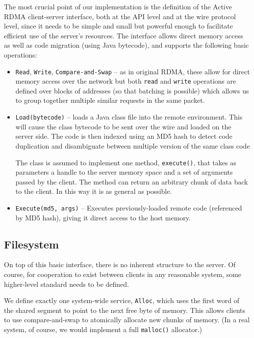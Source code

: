 \documentclass[10pt]{article}
\begin{document}
The most crucial point of our implementation is the definition of the
Active RDMA client-server interface, both at the API level and at the
wire protocol level, since it needs to be simple and small but
powerful enough to facilitate efficient use of the server's
resources. The interface allows direct memory access as well as code
migration (using Java bytecode), and supports the following basic
operations:

\begin{itemize}
  \item {\tt Read}, {\tt Write}, {\tt Compare-and-Swap} -- as in
    original RDMA, these allow for direct memory access over the
    network but both {\tt read} and {\tt write} operations are defined
    over blocks of addresses (so that batching is possible) which
    allows us to group together multiple similar requests in the same
    packet.
  \item {\tt Load(bytecode)} -- loads a Java class file into the
    remote environment. This will cause the class bytecode to be sent
    over the wire and loaded on the server side. The code is then
    indexed using an MD5 hash to detect code duplication and
    disambiguate between multiple version of the same class code
    
    The class is assumed to implement one method, {\tt execute()},
    that takes as parameters a handle to the server memory space and a
    set of arguments passed by the client. The method can return an
    arbitrary chunk of data back to the client. In this way it is as
    general as possible.
    
  \item {\tt Execute(md5, args)} -- Executes previously-loaded
    remote code (referenced by MD5 hash), giving it direct access to
    the host memory.
     
\end{itemize}

\subsection{Filesystem}

On top of this basic interface, there is no inherent structure to the
server. Of course, for cooperation to exist between clients in any
reasonable system, some higher-level standard needs to be defined.

We define exactly one system-wide service, {\tt Alloc}, which uses the
first word of the shared segment to point to the next free byte of
memory. This allows clients to use compare-and-swap to atomically
allocate new chunks of memory. (In a real system, of course, we would
implement a full {\tt malloc()} allocator.)
\end{document}
